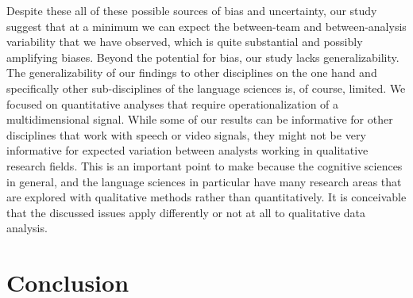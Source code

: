 \documentclass[Review,times,sageh]{sagej}
\begin{document}
Despite these all of these possible sources of bias and uncertainty, our study suggest that at a minimum we can expect the between-team and between-analysis variability that we have observed, which is quite substantial and possibly amplifying biases.
Beyond the potential for bias, our study lacks generalizability.
The generalizability of our findings to other disciplines on the one hand and specifically other sub-disciplines of the language sciences is, of course, limited.
We focused on quantitative analyses that require operationalization of a multidimensional signal.
While some of our results can be informative for other disciplines that work with speech or video signals, they might not be very informative for expected variation between analysts working in qualitative research fields.
This is an important point to make because the cognitive sciences in general, and the language sciences in particular have many research areas that are explored with qualitative methods rather than quantitatively.
It is conceivable that the discussed issues apply differently or not at all to qualitative data analysis.

\hypertarget{conclusion}{%
\section{Conclusion}\label{conclusion}}
\end{document}
